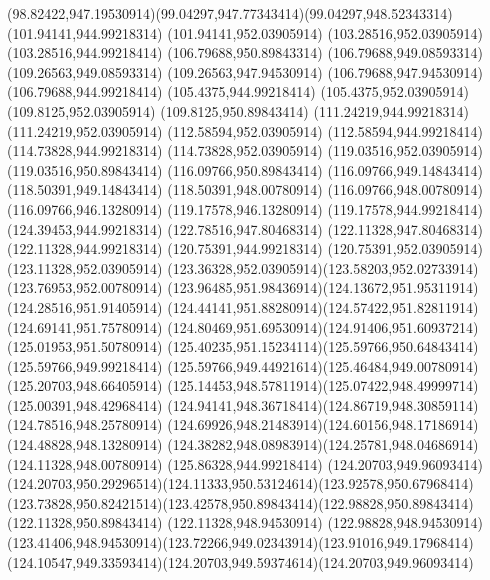 {{	\curveto(98.82422,947.19530914)(99.04297,947.77343414)(99.04297,948.52343314)
	\closepath
	\moveto(101.94141,944.99218314)
	\lineto(101.94141,952.03905914)
	\lineto(103.28516,952.03905914)
	\lineto(103.28516,944.99218414)
	\closepath
	\moveto(106.79688,950.89843314)
	\lineto(106.79688,949.08593314)
	\lineto(109.26563,949.08593314)
	\lineto(109.26563,947.94530914)
	\lineto(106.79688,947.94530914)
	\lineto(106.79688,944.99218414)
	\lineto(105.4375,944.99218414)
	\lineto(105.4375,952.03905914)
	\lineto(109.8125,952.03905914)
	\lineto(109.8125,950.89843414)
	\closepath
	\moveto(111.24219,944.99218314)
	\lineto(111.24219,952.03905914)
	\lineto(112.58594,952.03905914)
	\lineto(112.58594,944.99218414)
	\closepath
	\moveto(114.73828,944.99218314)
	\lineto(114.73828,952.03905914)
	\lineto(119.03516,952.03905914)
	\lineto(119.03516,950.89843414)
	\lineto(116.09766,950.89843414)
	\lineto(116.09766,949.14843414)
	\lineto(118.50391,949.14843414)
	\lineto(118.50391,948.00780914)
	\lineto(116.09766,948.00780914)
	\lineto(116.09766,946.13280914)
	\lineto(119.17578,946.13280914)
	\lineto(119.17578,944.99218414)
	\closepath
	\moveto(124.39453,944.99218314)
	\lineto(122.78516,947.80468314)
	\lineto(122.11328,947.80468314)
	\lineto(122.11328,944.99218314)
	\lineto(120.75391,944.99218314)
	\lineto(120.75391,952.03905914)
	\lineto(123.11328,952.03905914)
	\curveto(123.36328,952.03905914)(123.58203,952.02733914)(123.76953,952.00780914)
	\curveto(123.96485,951.98436914)(124.13672,951.95311914)(124.28516,951.91405914)
	\curveto(124.44141,951.88280914)(124.57422,951.82811914)(124.69141,951.75780914)
	\curveto(124.80469,951.69530914)(124.91406,951.60937214)(125.01953,951.50780914)
	\curveto(125.40235,951.15234114)(125.59766,950.64843414)(125.59766,949.99218414)
	\curveto(125.59766,949.44921614)(125.46484,949.00780914)(125.20703,948.66405914)
	\curveto(125.14453,948.57811914)(125.07422,948.49999714)(125.00391,948.42968414)
	\curveto(124.94141,948.36718414)(124.86719,948.30859114)(124.78516,948.25780914)
	\curveto(124.69926,948.21483914)(124.60156,948.17186914)(124.48828,948.13280914)
	\curveto(124.38282,948.08983914)(124.25781,948.04686914)(124.11328,948.00780914)
	\lineto(125.86328,944.99218414)
	\closepath
	\moveto(124.20703,949.96093414)
	\curveto(124.20703,950.29296514)(124.11333,950.53124614)(123.92578,950.67968414)
	\curveto(123.73828,950.82421514)(123.42578,950.89843414)(122.98828,950.89843414)
	\lineto(122.11328,950.89843414)
	\lineto(122.11328,948.94530914)
	\lineto(122.98828,948.94530914)
	\curveto(123.41406,948.94530914)(123.72266,949.02343914)(123.91016,949.17968414)
	\curveto(124.10547,949.33593414)(124.20703,949.59374614)(124.20703,949.96093414)
}}
